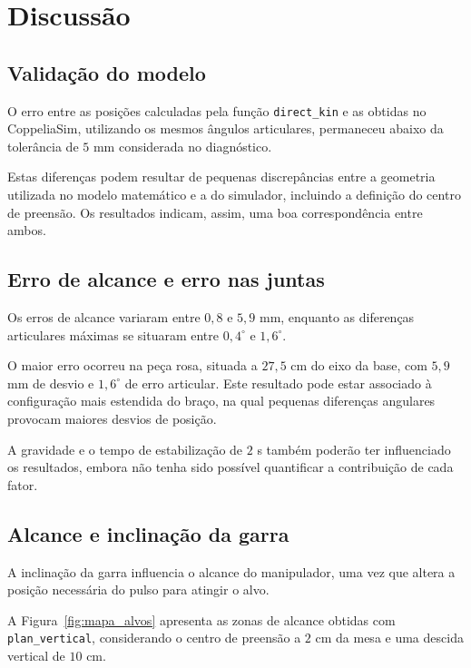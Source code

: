 
\section{Discussão}
\label{sec:disc}

\subsection{Validação do modelo}

O erro entre as posições calculadas pela função \texttt{direct\_kin} e as obtidas no CoppeliaSim, utilizando os mesmos ângulos articulares, permaneceu abaixo da tolerância de $5$ mm considerada no diagnóstico.

Estas diferenças podem resultar de pequenas discrepâncias entre a geometria utilizada no modelo matemático e a do simulador, incluindo a definição do centro de preensão. Os resultados indicam, assim, uma boa correspondência entre ambos.

\subsection{Erro de alcance e erro nas juntas}

Os erros de alcance variaram entre $0{,}8$ e $5{,}9$ mm, enquanto as diferenças articulares máximas se situaram entre $0{,}4^\circ$ e $1{,}6^\circ$.

O maior erro ocorreu na peça rosa, situada a $27{,}5$ cm do eixo da base, com $5{,}9$ mm de desvio e $1{,}6^\circ$ de erro articular. Este resultado pode estar associado à configuração mais estendida do braço, na qual pequenas diferenças angulares provocam maiores desvios de posição.

A gravidade e o tempo de estabilização de $2$ s também poderão ter influenciado os resultados, embora não tenha sido possível quantificar a contribuição de cada fator.

\subsection{Alcance e inclinação da garra}

A inclinação da garra influencia o alcance do manipulador, uma vez que altera a posição necessária do pulso para atingir o alvo.

A Figura~\ref{fig:mapa_alvos} apresenta as zonas de alcance obtidas com \texttt{plan\_vertical}, considerando o centro de preensão a $2$ cm da mesa e uma descida vertical de $10$ cm.

